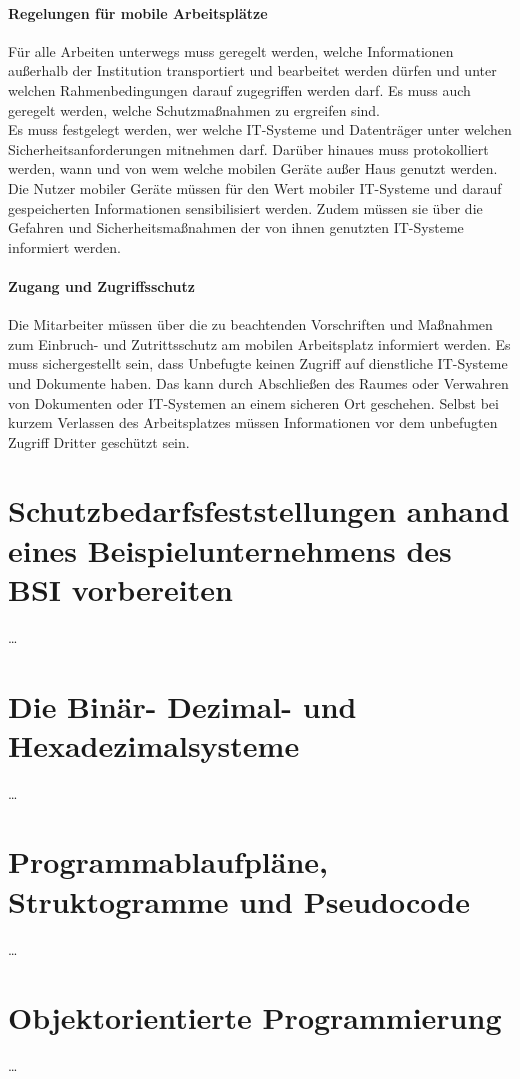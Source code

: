 \documentclass[a4paper, 12pt]{report}
\begin{document}
\begin{multicols}{2}
\paragraph{Regelungen für mobile Arbeitsplätze}

Für alle Arbeiten unterwegs muss geregelt werden, welche Informationen außerhalb
der Institution transportiert und bearbeitet werden dürfen und unter welchen 
Rahmenbedingungen darauf zugegriffen werden darf. Es muss auch geregelt werden,
welche Schutzmaßnahmen zu ergreifen sind. \\

Es muss festgelegt werden, wer welche IT-Systeme und Datenträger unter welchen
Sicherheitsanforderungen mitnehmen darf. Darüber hinaues muss protokolliert 
werden, wann und von wem welche mobilen Geräte außer Haus genutzt werden. \\

Die Nutzer mobiler Geräte müssen für den Wert mobiler IT-Systeme und darauf 
gespeicherten Informationen sensibilisiert werden. Zudem müssen sie über die 
Gefahren und Sicherheitsmaßnahmen der von ihnen genutzten IT-Systeme informiert
werden. 

\paragraph{Zugang und Zugriffsschutz}

Die Mitarbeiter müssen über die zu beachtenden Vorschriften und Maßnahmen zum 
Einbruch- und Zutrittsschutz am mobilen Arbeitsplatz informiert werden. Es muss
sichergestellt sein, dass Unbefugte keinen Zugriff auf dienstliche IT-Systeme 
und Dokumente haben. Das kann durch Abschließen des Raumes oder Verwahren von 
Dokumenten oder IT-Systemen an einem sicheren Ort geschehen. Selbst bei kurzem 
Verlassen des Arbeitsplatzes müssen Informationen vor dem unbefugten Zugriff 
Dritter geschützt sein. 

\section{Schutzbedarfsfeststellungen anhand eines Beispielunternehmens des BSI 
vorbereiten} %
\dots

\section{Die Binär- Dezimal- und Hexadezimalsysteme}
\dots

\section{Programmablaufpläne, Struktogramme und Pseudocode}
\dots

\section{Objektorientierte Programmierung}
\dots
\end{multicols}
\end{document}
